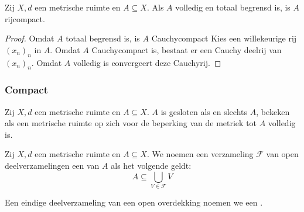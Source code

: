 \documentclass[main.tex]{subfiles}
\begin{document}
\begin{bst}
  \label{st:volledig-en-totaal-begrensd-dan-rijcompact}
  Zij $X,d$ een metrische ruimte en $A \subseteq X$.
  Als $A$ volledig en totaal begrensd is, is $A$ rijcompact.
  
  \begin{proof}
    Omdat $A$ totaal begrensd is, is $A$ Cauchycompact
    Kies een willekeurige rij $(x_{n})_{n}$ in $A$.
    Omdat $A$ Cauchycompact is, bestaat er een Cauchy deelrij van $(x_{n})_{n}$.
    Omdat $A$ volledig is convergeert deze Cauchyrij.
  \end{proof}
\end{bst}

\subsubsection{Compact}
\label{sec:compact}

\begin{st}
  Zij $X,d$ een metrische ruimte en $A \subseteq X$.
  $A$ is gesloten als en slechts $A$, bekeken als een metrische ruimte op zich voor de beperking van de metriek tot $A$ volledig is.
\end{st}

\begin{de}
  Zij $X,d$ een metrische ruimte en $A \subseteq X$.
  We noemen een verzameling $\mathcal{F}$ van open deelverzamelingen een  van $A$ als het volgende geldt:
  \[ A \subseteq \bigcup_{V \in \mathcal{F}}V \]
\end{de}

\begin{de}
  Een eindige deelverzameling van een open overdekking noemen we een .
\end{de}
\end{document}
